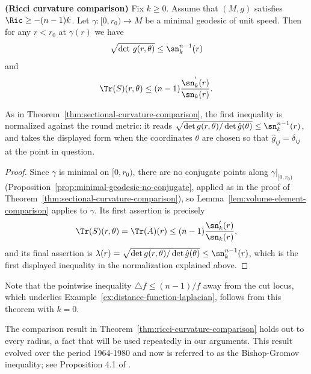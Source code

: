 \begin{theorem}
\label{thm:ricci-curvature-comparison}
\label{riccurvcomp}



{\bf (Ricci curvature comparison)} Fix $k\ge 0$. Assume that $(M,
g)$ satisfies $\Ric \geq -(n-1)k$. Let $\gamma\colon [0,r_0)\to
M$ be a minimal geodesic of unit speed. Then for any $r<r_0$ at
$\gamma(r)$ we have
$$\sqrt{\det\, g(r,\theta)} \leq \sn^{n-1}_{k}(r)$$ and
$$\Tr(S)(r,\theta) \leq (n-1)\frac{\sn_{k}^{'}(r)}{\sn_{k}(r)}.$$
\end{theorem}

As in Theorem~\ref{thm:sectional-curvature-comparison}, the first
inequality is normalized against the round metric: it reads
$\sqrt{\det g(r,\theta)/\det\hat g(\theta)}\le\sn_k^{n-1}(r)$, and
takes the displayed form when the coordinates $\theta$ are chosen
so that $\hat g_{ij}=\delta_{ij}$ at the point in question.

\begin{proof}
\sketch
{}
Since $\gamma$ is minimal on $[0,r_0)$, there are no conjugate
points along $\gamma|_{[0,r_0)}$
(Proposition~\ref{prop:minimal-geodesic-no-conjugate}, applied as in
the proof of Theorem~\ref{thm:sectional-curvature-comparison}), so
Lemma~\ref{lem:volume-element-comparison} applies to $\gamma$. Its
first assertion is precisely
$$\Tr(S)(r,\theta)=\Tr(A)(r)\le(n-1)\frac{\sn_k'(r)}{\sn_k(r)},$$
and its final assertion is
$\lambda(r)=\sqrt{\det g(r,\theta)/\det\hat g(\theta)}
\le\sn_k^{n-1}(r)$, which is the first displayed inequality in the
normalization explained above.
\end{proof}

Note that the pointwise inequality $\triangle f\le(n-1)/f$ away
from the cut locus, which underlies
Example~\ref{ex:distance-function-laplacian}, follows from this
theorem with $k=0$.

The comparison result in Theorem~\ref{thm:ricci-curvature-comparison} holds out to
every radius, a fact that will be used repeatedly in our arguments.
This result evolved over the period 1964-1980 and now is referred to
as the Bishop-Gromov inequality; see
Proposition 4.1 of \cite{CheegerGromovTaylor}.

